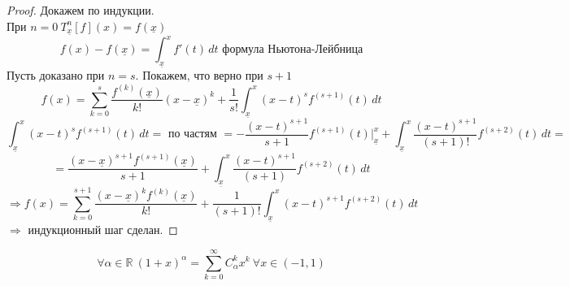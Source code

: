 \documentclass[11pt]{article}
\begin{document}
\begin{proof}
    Докажем по индукции.\\
    При $n=0 \ T_{\underline{x}}^n [f](x) = f(\underline{x})$\\
    \[ f(x) -f(\underline{x}) = \int_{\underline{x}}^{x} f'(t)\, dt \text{ формула Ньютона-Лейбница} \] 
    Пусть доказано при $n=s$. Покажем, что верно при $s+1$
    \[ f(x) = \sum_{k=0}^{s} \frac{f^{(k)}(\underline{x})}{k!} (x-\underline{x})^k + \frac{1}{s!} \int_{\underline{x}}^{x} (x-t)^s f^{(s+1)}(t)\,dt \] 
    \[ \int_{\underline{x}}^{x} (x-t)^s f^{(s+1)}(t)\,dt = \text{ по частям } = - \frac{(x-t)^{s+1}}{s+1}f^{(s+1)}(t) \bigg|_{\underline{x}}^{x} + \int_{\underline{x}}^{x} \frac{(x-t)^{s+1}}{(s+1)!} f^{(s+2)} (t)\,dt = \]
    \[ = \frac{(x-\underline{x})^{s+1}f^{(s+1)}(\underline{x})}{s+1} + \int_{\underline{x}}^{x} \frac{(x-t)^{s+1}}{(s+1)}f^{(s+2)}(t)\,dt \] 
    \[ \Rightarrow f(x) = \sum_{k=0}^{s+1} \frac{(x-\underline{x})^k f^{(k)}(\underline{x})}{k!} + \frac{1}{(s+1)!} \int_{\underline{x}}^{x} (x-t)^{s+1} f^{(s+2)}(t)\,dt \]
    $\Rightarrow$ индукционный шаг сделан.
\end{proof}

\begin{theorem}
    \[ \forall \alpha\in \mathbb{R} \ (1+x)^\alpha = \sum_{k=0}^{\infty} C_\alpha ^k x^k \ \forall x\in (-1,1) \] 
\end{theorem}
\end{document}
